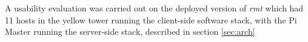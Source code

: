 \label{sec:evaluation}

A usability evaluation was carried out on the deployed version of \emph{rmt} which had 11 hosts in the yellow tower running the client-side software stack, with the Pi Master running the server-side stack, described in section \ref{sec:arch}